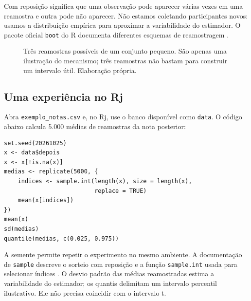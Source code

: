 Com reposição significa que uma observação pode aparecer várias vezes em uma reamostra e outra pode não aparecer. Não estamos coletando participantes novos: usamos a distribuição empírica para aproximar a variabilidade do estimador. O pacote oficial \texttt{boot} do R documenta diferentes esquemas de reamostragem \parencite{RBootstrap}.

\begin{figure}[H]
\centering
{}
\caption{Três reamostras possíveis de um conjunto pequeno. São apenas uma ilustração do mecanismo; três reamostras não bastam para construir um intervalo útil. Elaboração própria.}
\label{fig:bootstrap-mecanismo}
\end{figure}

\subsection{Uma experiência no Rj}

Abra \texttt{exemplo\_notas.csv} e, no Rj, use o banco disponível como \texttt{data}. O código abaixo calcula 5.000 médias de reamostras da nota posterior:

\begin{verbatim}
set.seed(20261025)
x <- data$depois
x <- x[!is.na(x)]
medias <- replicate(5000, {
    indices <- sample.int(length(x), size = length(x),
                          replace = TRUE)
    mean(x[indices])
})
mean(x)
sd(medias)
quantile(medias, c(0.025, 0.975))
\end{verbatim}

A semente permite repetir o experimento no mesmo ambiente. A documentação de \texttt{sample} descreve o sorteio com reposição e a função \texttt{sample.int} usada para selecionar índices \parencite{RAmostragem}. O desvio padrão das médias reamostradas estima a variabilidade do estimador; os quantis delimitam um intervalo percentil ilustrativo. Ele não precisa coincidir com o intervalo t.

